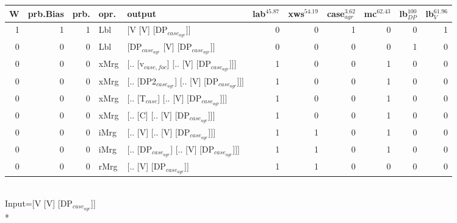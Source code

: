 \begin{tabularx}{\linewidth}{rrrlXrrrrrr}
\hline
   W &   prb.Bias &   prb. & opr.   & output                                     &   lab$^{45.87}$ &   xws$^{54.19}$ &   case$_{agr}^{3.62}$ &   mc$^{62.43}$ &   lb$_{DP}^{100}$ &   lb$_{V}^{61.96}$ \\
\hline
   1 &       1 &   1 & Lbl  & [V [V] [DP$_{case_{agr}}$]]                      &             0 &             0 &                  1 &            0 &                0 &              1 \\
   0 &       0 &   0 & Lbl  & [DP$_{case_{agr}}$ [V] [DP$_{case_{agr}}$]]            &             0 &             0 &                  0 &            0 &                1 &              0 \\
   0 &       0 &   0 & xMrg & [.. [v$_{case,foc}$] [.. [V] [DP$_{case_{agr}}$]]]   &             1 &             0 &                  0 &            1 &                0 &              0 \\
   0 &       0 &   0 & xMrg & [.. [DP2$_{case_{agr}}$] [.. [V] [DP$_{case_{agr}}$]]] &             1 &             0 &                  0 &            1 &                0 &              0 \\
   0 &       0 &   0 & xMrg & [.. [T$_{case}$] [.. [V] [DP$_{case_{agr}}$]]]       &             1 &             0 &                  0 &            1 &                0 &              0 \\
   0 &       0 &   0 & xMrg & [.. [C] [.. [V] [DP$_{case_{agr}}$]]]            &             1 &             0 &                  0 &            1 &                0 &              0 \\
   0 &       0 &   0 & iMrg & [.. [V] [.. [V] [DP$_{case_{agr}}$]]]            &             1 &             1 &                  0 &            1 &                0 &              0 \\
   0 &       0 &   0 & iMrg & [.. [DP$_{case_{agr}}$] [.. [V] [DP$_{case_{agr}}$]]]  &             1 &             1 &                  0 &            1 &                0 &              0 \\
   0 &       0 &   0 & rMrg & [.. [V] [DP$_{case_{agr}}$]]                     &             1 &             1 &                  0 &            0 &                0 &              0 \\
\hline
\end{tabularx}\endgroup\\
\begingroup\scriptsize Input=[V [V] [DP$_{case_{agr}}$]]\\*
